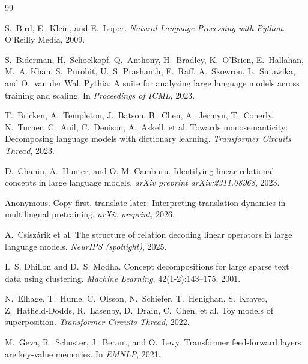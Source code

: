 \documentclass[11pt,letterpaper]{article}
\begin{document}

\begin{thebibliography}{99}

S.~Bird, E.~Klein, and E.~Loper.
\newblock \emph{Natural Language Processing with Python}.
\newblock O'Reilly Media, 2009.

S.~Biderman, H.~Schoelkopf, Q.~Anthony, H.~Bradley, K.~O'Brien, E.~Hallahan, M.~A. Khan, S.~Purohit, U.~S. Prashanth, E.~Raff, A.~Skowron, L.~Sutawika, and O.~van der Wal.
\newblock Pythia: A suite for analyzing large language models across training and scaling.
\newblock In \emph{Proceedings of ICML}, 2023.

T.~Bricken, A.~Templeton, J.~Batson, B.~Chen, A.~Jermyn, T.~Conerly, N.~Turner, C.~Anil, C.~Denison, A.~Askell, et al.
\newblock Towards monosemanticity: Decomposing language models with dictionary learning.
\newblock \emph{Transformer Circuits Thread}, 2023.

D.~Chanin, A.~Hunter, and O.-M. Camburu.
\newblock Identifying linear relational concepts in large language models.
\newblock \emph{arXiv preprint arXiv:2311.08968}, 2023.

Anonymous.
\newblock Copy first, translate later: Interpreting translation dynamics in multilingual pretraining.
\newblock \emph{arXiv preprint}, 2026.

A.~Csisz\'arik et al.
\newblock The structure of relation decoding linear operators in large language models.
\newblock \emph{NeurIPS (spotlight)}, 2025.

I.~S. Dhillon and D.~S. Modha.
\newblock Concept decompositions for large sparse text data using clustering.
\newblock \emph{Machine Learning}, 42(1-2):143--175, 2001.

N.~Elhage, T.~Hume, C.~Olsson, N.~Schiefer, T.~Henighan, S.~Kravec, Z.~Hatfield-Dodds, R.~Lasenby, D.~Drain, C.~Chen, et al.
\newblock Toy models of superposition.
\newblock \emph{Transformer Circuits Thread}, 2022.

M.~Geva, R.~Schuster, J.~Berant, and O.~Levy.
\newblock Transformer feed-forward layers are key-value memories.
\newblock In \emph{EMNLP}, 2021.


\end{thebibliography}
\end{document}
